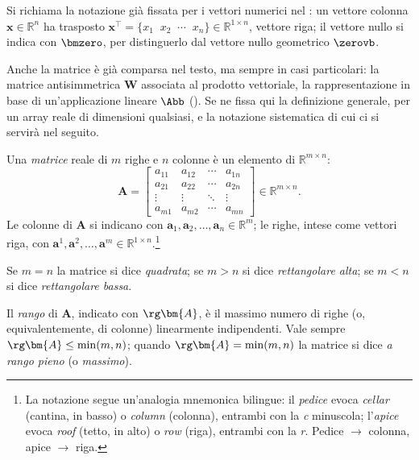 \medskip

Si richiama la notazione già fissata per i vettori numerici nel : un vettore colonna $\bm{x}\in\mathbb{R}^n$ ha trasposto $\bm{x}^\top = \{x_1\;\;x_2\;\;\cdots\;\;x_n\}\in\mathbb{R}^{1\times n}$, vettore riga; il vettore nullo si indica con $\bmzero$, per distinguerlo dal vettore nullo geometrico $\zerovb$.

Anche la matrice è già comparsa nel testo, ma sempre in casi particolari: la matrice antisimmetrica $\bm{W}$ associata al prodotto vettoriale, la rappresentazione in base di un'applicazione lineare $\Abb$ (). Se ne fissa qui la definizione generale, per un array reale di dimensioni qualsiasi, e la notazione sistematica di cui ci si servirà nel seguito.

Una \textit{matrice} reale di $m$ righe e $n$ colonne è un elemento di $\mathbb{R}^{m \times n}$:
\begin{equation}
	\bm{A} = \begin{bmatrix}
		a_{11} & a_{12} & \cdots & a_{1n} \\
		a_{21} & a_{22} & \cdots & a_{2n} \\
		\vdots & \vdots & \ddots & \vdots \\
		a_{m1} & a_{m2} & \cdots & a_{mn}
	\end{bmatrix} \in \mathbb{R}^{m \times n}.
\end{equation}
Le colonne di $\bm{A}$ si indicano con $\bm{a}_1, \bm{a}_2, \ldots, \bm{a}_n \in \mathbb{R}^m$; le righe, intese come vettori riga, con $\bm{a}^1, \bm{a}^2, \ldots, \bm{a}^m \in \mathbb{R}^{1\times n}$.\footnote{La notazione segue un'analogia mnemonica bilingue: il \emph{pedice} evoca \textit{cellar} (cantina, in basso) o \textit{column} (colonna), entrambi con la \textit{c} minuscola; l'\emph{apice} evoca \textit{roof} (tetto, in alto) o \textit{row} (riga), entrambi con la \textit{r}. Pedice $\to$ colonna, apice $\to$ riga.}



Se $m=n$ la matrice si dice \textit{quadrata}; se $m>n$ si dice \textit{rettangolare alta}; se $m<n$ si dice \textit{rettangolare bassa}.

Il \textit{rango} di $\bm{A}$, indicato con $\rg\bm{A}$, \`e il massimo numero di righe (o, equivalentemente, di colonne) linearmente indipendenti. Vale sempre $\rg\bm{A} \leq \min(m,n)$; quando $\rg\bm{A} = \min(m,n)$ la matrice si dice \textit{a rango pieno} (o \textit{massimo}).


